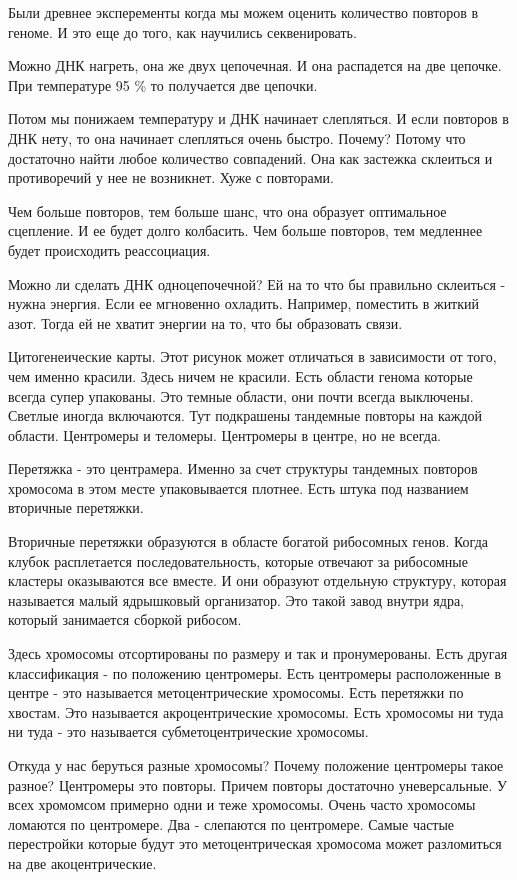 Были древнее эксперементы  когда мы можем оценить количество 
повторов в геноме. И это еще до того, как
научились секвенировать. 

Можно ДНК нагреть, она же двух цепочечная. И она распадется на 
две цепочке. При температуре 95 \% то получается две цепочки. 

Потом мы понижаем температуру и ДНК начинает слепляться. 
И если повторов в ДНК нету, то она начинает слепляться очень быстро. 
Почему? Потому что достаточно найти любое количество совпадений. Она 
как застежка склеиться и противоречий у нее не возникнет. Хуже с повторами. 

Чем больше повторов, тем больше шанс, что она образует оптимальное сцепление. 
И ее будет долго колбасить. Чем больше повторов, 
тем медленнее будет происходить реассоциация. 

Можно ли сделать ДНК одноцепочечной? Ей на то что бы правильно 
склеиться - нужна энергия. Если ее мгновенно охладить. Например, 
поместить в житкий азот. Тогда ей не хватит 
энергии на то, что бы образовать связи. 

Цитогенеические карты. 
Этот рисунок может отличаться в зависимости от того, 
чем именно красили. Здесь ничем не красили. Есть области 
генома которые всегда супер упакованы. Это темные 
области, они почти всегда выключены. Светлые иногда включаются. 
Тут подкрашены тандемные повторы на каждой области. Центромеры и 
теломеры. Центромеры в центре, но не 
всегда. 

Перетяжка - это центрамера. Именно за счет структуры тандемных повторов хромосома в этом 
месте упаковывается плотнее. Есть штука под названием вторичные перетяжки. 

Вторичные перетяжки образуются в областе богатой рибосомных генов. Когда 
клубок расплетается последовательность, 
которые отвечают за рибосомные кластеры оказываются все вместе. 
И они образуют отдельную структуру, которая называется малый ядрышковый организатор. Это 
такой завод внутри ядра, который занимается сборкой рибосом. 

Здесь хромосомы отсортированы по размеру 
и так и пронумерованы. Есть другая классификация - 
по положению центромеры. Есть центромеры расположенные в центре - 
это называется метоцентрические хромосомы. Есть 
перетяжки по хвостам. Это называется акроцентрические хромосомы. 
Есть хромосомы ни туда ни туда - это называется субметоцентрические 
хромосомы. 

Откуда у нас беруться разные хромосомы? Почему положение центромеры такое 
разное? 
Центромеры это повторы. Причем повторы достаточно уневерсальные. У всех 
хромомсом примерно одни и теже хромосомы. Очень часто хромосомы ломаются 
по центромере. Два - слепаются по центромере. Самые частые перестройки которые будут это
метоцентрическая хромосома может разломиться на две акоцентрические. 

